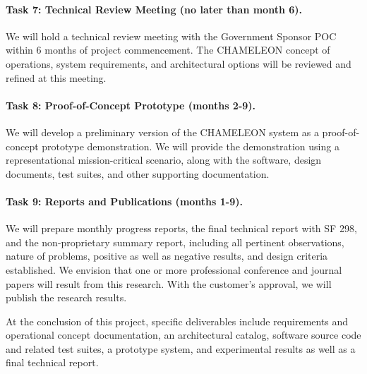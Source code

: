 \documentclass{sbir}
\begin{document}
\paragraph{Task 7: Technical Review Meeting (no later than month 6).}
We will hold a technical review meeting with the Government Sponsor POC within 6 months of project commencement. The CHAMELEON concept of operations, system requirements, and architectural options will be reviewed and refined at this meeting.

\paragraph{Task 8: Proof-of-Concept Prototype (months 2-9).}
We will develop a preliminary version of the CHAMELEON system as a proof-of-concept prototype demonstration. We will provide the demonstration using a representational mission-critical scenario, along with the software, design documents, test suites, and other supporting documentation.

\paragraph{Task 9: Reports and Publications (months 1-9).}
We will prepare monthly progress reports, the final technical report with SF 298, and the non-proprietary summary report, including all pertinent observations, nature of problems, positive as well as negative results, and design criteria established. We envision that one or more professional conference and journal papers will result from this research. With the customer's approval, we will publish the research results.

At the conclusion of this project, specific deliverables include requirements and operational concept documentation, an architectural catalog, software source code and related test suites, a prototype system, and experimental results as well as a final technical report. 
\end{document}
